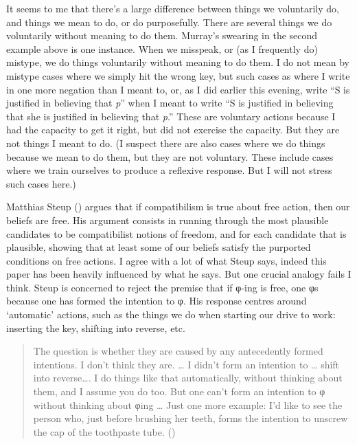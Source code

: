 \documentclass[
  11pt,
  letterpaper,
  DIV=11,
  numbers=noendperiod,
  twoside]{scrartcl}
\begin{document}
It seems to me that there's a large difference between things we
voluntarily do, and things we mean to do, or do purposefully. There are
several things we do voluntarily without meaning to do them. Murray's
swearing in the second example above is one instance. When we misspeak,
or (as I frequently do) mistype, we do things voluntarily without
meaning to do them. I do not mean by mistype cases where we simply hit
the wrong key, but such cases as where I write in one more negation than
I meant to, or, as I did earlier this evening, write ``S is justified in
believing that \emph{p}'' when I meant to write ``S is justified in
believing that she is justified in believing that \emph{p}.'' These are
voluntary actions because I had the capacity to get it right, but did
not exercise the capacity. But they are not things I meant to do. (I
suspect there are also cases where we do things because we mean to do
them, but they are not voluntary. These include cases where we train
ourselves to produce a reflexive response. But I will not stress such
cases here.)

Matthias Steup () argues that if
compatibilism is true about free action, then our beliefs are free. His
argument consists in running through the most plausible candidates to be
compatibilist notions of freedom, and for each candidate that is
plausible, showing that at least some of our beliefs satisfy the
purported conditions on free actions. I agree with a lot of what Steup
says, indeed this paper has been heavily influenced by what he says. But
one crucial analogy fails I think. Steup is concerned to reject the
premise that if φ-ing is free, one φs because one has formed the
intention to φ. His response centres around `automatic' actions, such as
the things we do when starting our drive to work: inserting the key,
shifting into reverse, etc.

\begin{quote}
The question is whether they are caused by any antecedently formed
intentions. I don't think they are. \ldots{} I didn't form an intention
to \ldots{} shift into reverse\ldots. I do things like that
automatically, without thinking about them, and I assume you do too. But
one can't form an intention to φ without thinking about φing \ldots{}
Just one more example: I'd like to see the person who, just before
brushing her teeth, forms the intention to unscrew the cap of the
toothpaste tube. ()
\end{quote}
\end{document}
